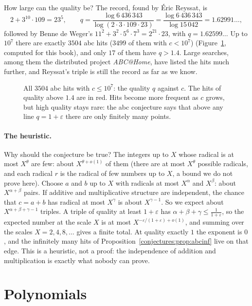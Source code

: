 How large can the quality be? The record, found by \'Eric Reyssat, is
\[
2+3^{10}\cdot109=23^5,\qquad q=\frac{\log 6\,436\,343}{\log(2\cdot3\cdot109\cdot23)}=\frac{\log6\,436\,343}{\log15\,042}=1.62991\ldots,
\]
followed by Benne de Weger's $11^2+3^2\cdot5^6\cdot7^3=2^{21}\cdot23$, with $q=1.62599\ldots$ Up to $10^7$ there are exactly $3504$ abc hits ($3499$ of them with $c<10^7$)
(Figure~\ref{conjectures:fig:abcquality}, computed for this book), and only $17$ of them have $q>1.4$. Large searches, among them the distributed project
\emph{ABC@Home}, have listed the hits much further, and Reyssat's triple is still the record as far as we know.

\begin{figure}[ht]
\centering
{}
\caption{All $3504$ abc hits with $c\le10^7$: the quality $q$ against $c$. The hits of quality above $1.4$ are in red. Hits become more frequent as $c$
grows, but high quality stays rare: the abc conjecture says that above any line $q=1+\varepsilon$ there are only finitely many points.}
\label{conjectures:fig:abcquality}
\end{figure}

\paragraph{The heuristic.} Why should the conjecture be true? The integers up to $X$ whose radical is at most $X^\theta$ are few: about $X^{\theta+o(1)}$
of them (there are at most $X^\theta$ possible radicals, and each radical $r$ is the radical of few numbers up to $X$, a bound we do not prove here).
Choose $a$ and $b$ up to $X$ with radicals at most $X^\alpha$ and $X^\beta$: about $X^{\alpha+\beta}$ pairs. If additive and multiplicative structure
are independent, the chance that $c=a+b$ has radical at most $X^\gamma$ is about $X^{\gamma-1}$. So we expect about $X^{\alpha+\beta+\gamma-1}$ triples.
A triple of quality at least $1+\varepsilon$ has $\alpha+\beta+\gamma\le\frac1{1+\varepsilon}$, so the expected number at the scale $X$ is at most
$X^{-\varepsilon/(1+\varepsilon)+o(1)}$, and summing over the scales $X=2,4,8,\dots$ gives a finite total. At quality exactly $1$ the exponent is $0$,
and the infinitely many hits of Proposition~\ref{conjectures:prop:abcinf} live on that edge. This is a heuristic, not a proof: the independence of addition and
multiplication is exactly what nobody can prove.

\section{Polynomials}


